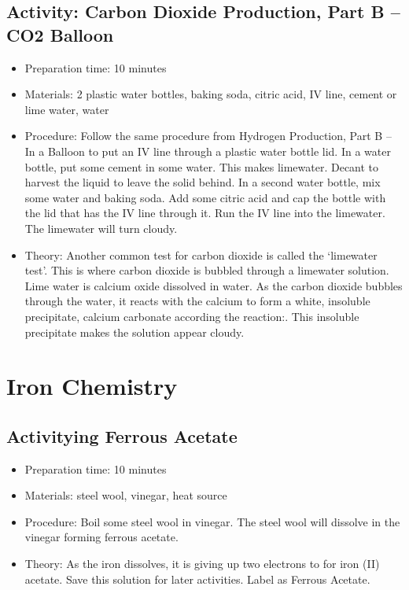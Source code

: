 \begin{itemize}
{\begin{itemize}
\begin{itemize}
{\subsection{Activity: Carbon Dioxide Production, Part B – CO2 Balloon}
\begin{itemize}
\item{Preparation time: 10 minutes}
\item{Materials: 2 plastic water bottles, baking soda, citric acid, IV line, cement or lime water, water}
\item{Procedure: Follow the same procedure from Hydrogen Production, Part B – In a Balloon to put an IV line through a plastic water bottle lid. In a water bottle, put some cement in some water. This makes limewater. Decant to harvest the liquid to leave the solid behind. In a second water bottle, mix some water and baking soda. Add some citric acid and cap the bottle with the lid that has the IV line through it. Run the IV line into the limewater. The limewater will turn cloudy.}
\item{Theory: Another common test for carbon dioxide is called the ‘limewater test’. This is where carbon dioxide is bubbled through a limewater solution. Lime water is calcium oxide dissolved in water. As the carbon dioxide bubbles through the water, it reacts with the calcium to form a white, insoluble precipitate, calcium carbonate according the reaction:. This insoluble precipitate makes the solution appear cloudy. }
\end{itemize}

\section{Iron Chemistry}

\subsection{Activitying Ferrous Acetate}
\begin{itemize}
\item{Preparation time: 10 minutes}
\item{Materials: steel wool, vinegar, heat source}
\item{Procedure: Boil some steel wool in vinegar. The steel wool will dissolve in the vinegar forming ferrous acetate.}
\item{Theory: As the iron dissolves, it is giving up two electrons to for iron (II) acetate. Save this solution for later activities. Label as Ferrous Acetate.}
\end{itemize}

}
\end{itemize}
\end{itemize}}
\end{itemize}
